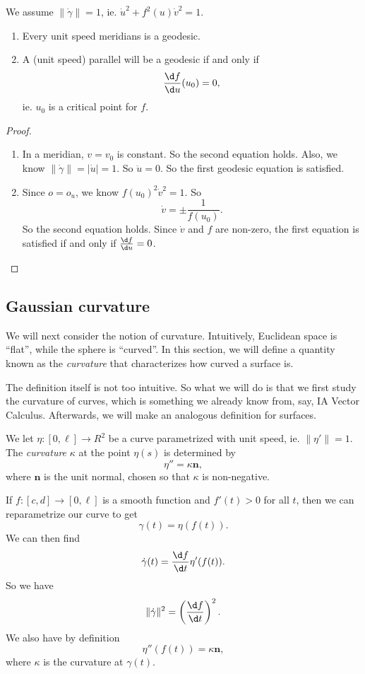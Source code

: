 \documentclass[a4paper]{article}
\begin{document}
\begin{prop}
  We assume $\|\dot{\gamma}\| = 1$, ie. $\dot{u}^2 + f^2 (u) \dot{v}^2 = 1$.
  \begin{enumerate}
    \item Every unit speed meridians is a geodesic.
    \item A (unit speed) parallel will be a geodesic if and only if
      \[
        \frac{\d f}{\d u} (u_0) = 0,
      \]
      ie. $u_0$ is a critical point for $f$.
  \end{enumerate}
\end{prop}

\begin{proof}\leavevmode
  \begin{enumerate}
    \item In a meridian, $v = v_0$ is constant. So the second equation holds. Also, we know $\|\dot{\gamma}\| = |\dot{u}| = 1$. So $\ddot{u} = 0$. So the first geodesic equation is satisfied.
    \item Since $o = o_u$, we know $f(u_0)^2 \dot{v}^2 = 1$. So
      \[
        \dot{v} = \pm \frac{1}{f(u_0)}.
      \]
      So the second equation holds. Since $\dot{v}$ and $f$ are non-zero, the first equation is satisfied if and only if $\frac{\d f}{\d u} = 0$.
  \end{enumerate}
\end{proof}

\subsection{Gaussian curvature}
We will next consider the notion of curvature. Intuitively, Euclidean space is ``flat'', while the sphere is ``curved''. In this section, we will define a quantity known as the \emph{curvature} that characterizes how curved a surface is.

The definition itself is not too intuitive. So what we will do is that we first study the curvature of curves, which is something we already know from, say, IA Vector Calculus. Afterwards, we will make an analogous definition for surfaces.

\begin{defi}
  We let $\eta: [0, \ell] \to R^2$ be a curve parametrized with unit speed, ie. $\|\eta'\| = 1$. The \emph{curvature} $\kappa$ at the point $\eta(s)$ is determined by
  \[
    \eta'' = \kappa \mathbf{n},
  \]
  where $\mathbf{n}$ is the unit normal, chosen so that $\kappa$ is non-negative.
\end{defi}
If $f: [c, d] \to [0, \ell]$ is a smooth function and $f'(t) > 0$ for all $t$, then we can reparametrize our curve to get
\[
  \gamma(t) = \eta(f(t)).
\]
We can then find
\[
  \dot{\gamma}(t) = \frac{\d f}{\d t} \eta'(f(t)).
\]
So we have
\[
  \|\dot{\gamma}\|^2 =\left(\frac{\d f}{\d t}\right)^2.
\]
We also have by definition
\[
  \eta''(f(t)) = \kappa \mathbf{n},
\]
where $\kappa$ is the curvature at $\gamma(t)$.
\end{document}
